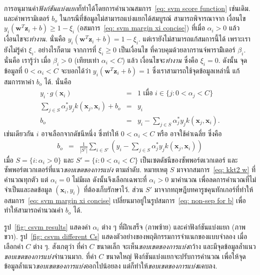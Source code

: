 การอนุมานค่า\textit{ฟังก์ชันแบ่งแยก}ก็ทำได้โดยการคำนวณสมการ~\ref{eq: svm score function} เช่นเดิม.
และค่าพารามิเตอร์ $b_o$ 
ในกรณีที่ข้อมูลไม่สามารถแบ่งแยกได้สมบูรณ์ 
สามารถพิจารณาจาก
เงื่อนไข $y_i \left( \bm{w}^T \bm{z}_i + b \right) \geq 1 - \xi_i$ (อสมการ~\ref{eq: svm margin xi concise})
ที่เมื่อ $\alpha_i > 0$ แล้ว เงื่อนไขจะ\textit{ทำงาน}. 
นั่นคือ $y_i \left( \bm{w}^T \bm{z}_i + b \right) = 1 - \xi_i$.
แต่เรายังไม่สามารถแก้สมการนี้ได้ เพราะเรายังไม่รู้ค่า $\xi_i$.
อย่างไรก็ตาม จากการที่ $\xi_i \geq 0$ เป็นเงื่อนไข ที่ควบคุมด้วยลากรานจ์พารามิิเตอร์ $\beta_i$.
นั่นคือ เรารู้ว่า เมื่อ $\beta_i > 0$ (เทียบเท่า $\alpha_i < C$) แล้ว เงื่อนไขจะ\textit{ทำงาน} ซึ่งคือ $\xi_i = 0$.
ดังนั้น จุดข้อมูลที่ $0 < \alpha_i < C$ จะบอกได้ว่า $y_i \left( \bm{w}^T \bm{z}_i + b \right) = 1$
ซึ่งเราสามารถใช้จุดข้อมูลเหล่านี้ แก้สมการหาค่า $b_o$ ได้.
นั่นคือ
\begin{eqnarray}
y_i \cdot g(\bm{x}_i) &=& 1  \mbox{ เมื่อ } i \in \{j: 0 < \alpha_j < C \}
\label{eq: non-sep for b} \\
\sum_{j \in S} \alpha^\ast_j y_j k(\bm{x}_j,\bm{x}_i) + b_o &=& y_i 
\nonumber \\
b_o &=& y_i - \sum_{j \in S} \alpha^\ast_j y_j k(\bm{x}_j,\bm{x}_i)
\label{eq: svm b general}.
\end{eqnarray}
เช่นเดียวกัน $i$ อาจเลือกจากดัชนีหนึ่ง ซึ่งทำให้ $0 < \alpha_i < C$ 
หรือ อาจใช้ค่าเฉลี่ย ซึ่งคือ
\begin{eqnarray}
b_o &=& \frac{1}{|S'|} \sum_{i \in S'} \left( y_i - \sum_{j \in S} \alpha^\ast_j y_j k(\bm{x}_j,\bm{x}_i) \right)
\label{eq: svm bo}
\end{eqnarray}
เมื่อ $S = \{i: \alpha_i > 0\}$ และ $S' = \{i: 0 < \alpha_i < C\}$ เป็นเซตดัชนีของซัพพอร์ตเวกเตอร์ และซัพพอร์ตเวกเตอร์ที่แนว\textit{ขอบเขตของการแบ่ง} ตามลำดับ.
หมายเหตุ $S$ มาจากสมการ~\ref{eq: kkt2 w} ที่คำนวณทุกตัว แต่ $\alpha_i = 0$ ไม่มีผล ดังนั้นจึงเลือกเฉพาะที่ $\alpha_i > 0$ มาคำนวณ เพื่อลดการคำนวณที่ไม่จำเป็นและลดข้อมูล $(\bm{x}_i, y_i)$ ที่ต้องเก็บรักษาไว้.
ส่วน $S'$ มาจากทฤษฎีบทคารูชคุนทักเกอร์ที่ทำให้อสมการ~\ref{eq: svm margin xi concise} เปลี่ยนมาอยู่ในรูปสมการ~\ref{eq: non-sep for b} เพื่อทำให้สามารถคำนวณค่า $b_o$ ได้.

รูป~\ref{fig: csvm results} แสดงค่า $\alpha_i$ ต่าง ๆ ที่ฝึกเสร็จ (ภาพซ้าย)
และค่าฟังก์ชันแบ่งแยก (ภาพขวา).
รูป~\ref{fig: csvm different Cs} แสดงตัวอย่างของพฤติกรรมการจำแนกของแบบจำลอง
เมื่อเลือกค่า $C$ ต่าง ๆ.
สังเกตุว่า ที่ค่า $C$ ขนาดเล็ก จะเห็น\textit{ขอบเขตของการแบ่ง}กว้าง 
และมีจุดข้อมูลล้ำแนว\textit{ขอบเขตของการแบ่ง}จำนวนมาก.
ที่ค่า $C$ ขนาดใหญ่ ฟังก์ชันแบ่งแยกจะปรับการคำนวณ 
เพื่อให้จุดข้อมูลล้ำแนว\textit{ขอบเขตของการแบ่ง}ออกไปน้อยลง แต่ก็ทำให้\textit{ขอบเขตของการแบ่ง}แคบลง.

